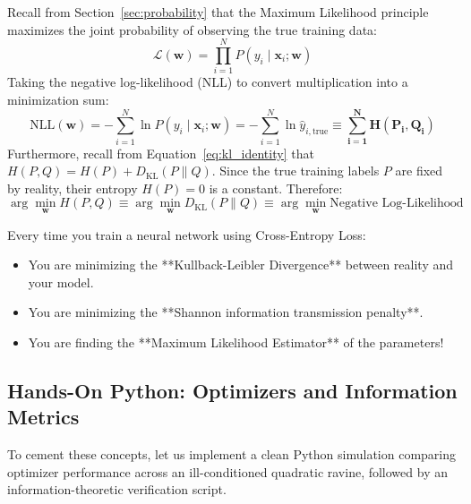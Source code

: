 \begin{keyidea}
Recall from Section~\ref{sec:probability} that the Maximum Likelihood principle maximizes the joint probability of observing the true training data:
\begin{equation}
\mathcal{L}(\mathbf{w}) = \prod_{i=1}^{N} P(y_i \mid \mathbf{x}_i; \mathbf{w})
\end{equation}
Taking the negative log-likelihood (NLL) to convert multiplication into a minimization sum:
\begin{equation}
\text{NLL}(\mathbf{w}) = -\sum_{i=1}^{N} \ln P(y_i \mid \mathbf{x}_i; \mathbf{w}) = -\sum_{i=1}^{N} \ln \hat{y}_{i, \text{true}} \equiv \mathbf{\sum_{i=1}^{N} H(P_i, Q_i)}
\end{equation}
Furthermore, recall from Equation~\eqref{eq:kl_identity} that $H(P, Q) = H(P) + D_{\text{KL}}(P \parallel Q)$. Since the true training labels $P$ are fixed by reality, their entropy $H(P) = 0$ is a constant. Therefore:
\begin{equation}
\arg\min_{\mathbf{w}} H(P, Q) \equiv \arg\min_{\mathbf{w}} D_{\text{KL}}(P \parallel Q) \equiv \arg\min_{\mathbf{w}} \text{Negative Log-Likelihood}
\end{equation}
\end{keyidea}

Every time you train a neural network using Cross-Entropy Loss:
\begin{itemize}
    \item You are minimizing the **Kullback-Leibler Divergence** between reality and your model.
    \item You are minimizing the **Shannon information transmission penalty**.
    \item You are finding the **Maximum Likelihood Estimator** of the parameters!
\end{itemize}

\subsection{Hands-On Python: Optimizers and Information Metrics}\label{subsec:opt_python}

To cement these concepts, let us implement a clean Python simulation comparing optimizer performance across an ill-conditioned quadratic ravine, followed by an information-theoretic verification script.

